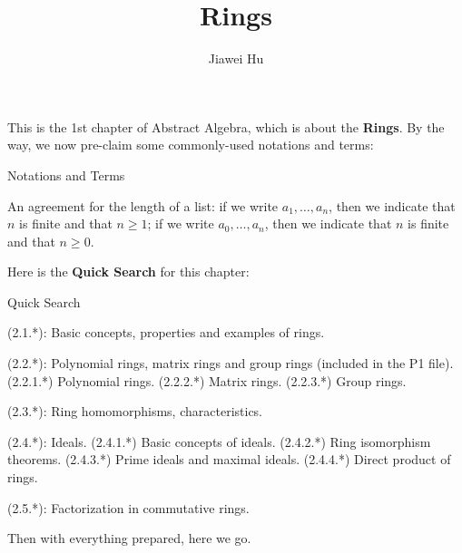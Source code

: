\documentclass{article}
\title{\LARGE \textbf{Rings}}
\author{\large Jiawei Hu}
\begin{document}
\maketitle

This is the 1st chapter of Abstract Algebra, which is about the \textbf{Rings}. By the way, we now pre-claim some commonly-used notations and terms:
\begin{Df}{Notations and Terms}
    \begin{compactenum}
        \item An agreement for the length of a list: if we write $a_1, \dots, a_n$, then we indicate that $n$ is finite and that $n\geq 1$; if we write $a_0, \dots, a_n$, then we indicate that $n$ is finite and that $n\geq 0$.
    \end{compactenum}
\end{Df}

Here is the \textbf{Quick Search} for this chapter:
\begin{Th}{Quick Search}
    \begin{compactdesc}
        \item (2.1.*): Basic concepts, properties and examples of rings.
        \item (2.2.*): Polynomial rings, matrix rings and group rings (included in the P1 file).
            \subitem (2.2.1.*) Polynomial rings.
            \subitem (2.2.2.*) Matrix rings.
            \subitem (2.2.3.*) Group rings.
        \item (2.3.*): Ring homomorphisms, characteristics.
        \item (2.4.*): Ideals.
            \subitem (2.4.1.*) Basic concepts of ideals.
            \subitem (2.4.2.*) Ring isomorphism theorems.
            \subitem (2.4.3.*) Prime ideals and maximal ideals.
            \subitem (2.4.4.*) Direct product of rings.
        \item (2.5.*): Factorization in commutative rings.
    \end{compactdesc}
\end{Th}

Then with everything prepared, here we go. 
\end{document}
